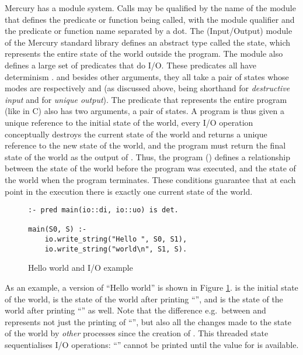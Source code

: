 Mercury has a module system.
Calls may be qualified by the name of the module
that defines the predicate or function being called,
with the module qualifier and the predicate or function name
separated by a dot.
The \io (Input/Output) module of the Mercury standard library
defines an abstract type called the \io state,
which represents the entire state of the world outside the program.
The \io module also defines a large set of predicates that do I/O.
These predicates all have determinism .
and besides other arguments,
they all take a pair of \io states
whose modes are respectively \di and \uo
(as discussed above, \di being shorthand for \emph{destructive input}
and \uo for \emph{unique output}).
The  predicate that represents the entire program
(like  in C)
also has two arguments, a  pair of \io states.
A program is thus given
a unique reference to the initial state of the world,
every I/O operation conceptually destroys the current state of the world
and returns a unique reference to the new state of the world,
and the program must return the final state of the world
as the output of .
Thus, the program () defines a relationship between the state
of the world before the program was executed,
and the state of the world when the program terminates.
These conditions guarantee that at each point in the execution
there is exactly one current state of the world.

\begin{figure}
\begin{verbatim}
:- pred main(io::di, io::uo) is det.

main(S0, S) :-
    io.write_string("Hello ", S0, S1),
    io.write_string("world\n", S1, S).
\end{verbatim}
\caption{Hello world and I/O example}
\label{fig:hello}
\end{figure}

As an example, a version of ``Hello world'' is shown in Figure
\ref{fig:hello}.
 is the initial state of the world,
 is the state of the world after printing ``'',
and  is the state of the world
after printing ``'' as well.
Note that the difference e.g.\ between  and 
represents not just the printing of ``'',
but also all the changes made to the state of the world
by \emph{other} processes since the creation of .
This threaded state sequentialises I/O operations:
``'' cannot be printed until the value for 
is available.

